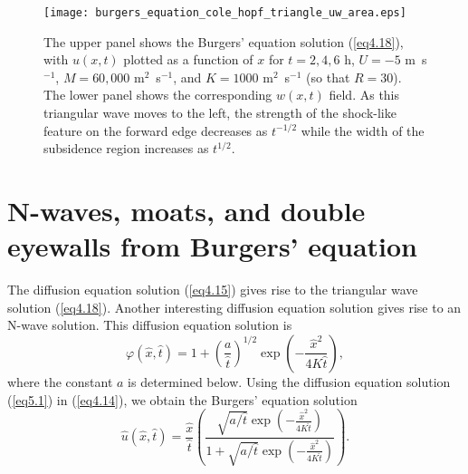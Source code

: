\documentclass[10pt]{article}
\begin{document}
\begin{figure}[!t]             %
\centerline{\texttt{[image: burgers\_equation\_cole\_hopf\_triangle\_uw\_area.eps]}}
\caption{The upper panel shows the Burgers' equation solution (\ref{eq4.18}),
with $u(x,t)$ plotted as a function of $x$ for $t=2,4,6$ h, $U=-5$ m\, s$^{-1}$,
$M=60,000$ m$^2$~s$^{-1}$, and $K=1000$ m$^2$~s$^{-1}$ (so that $R=30$). The lower
panel shows the corresponding $w(x,t)$ field. As this triangular wave
moves to the left, the strength of the shock-like feature on the forward edge decreases as $t^{-1/2}$
while the width of the subsidence region increases as $t^{1/2}$.}
\end{figure}



\section{N-waves, moats, and double eyewalls from Burgers' equation}    %

     The diffusion equation solution (\ref{eq4.15}) gives rise to the
triangular wave solution (\ref{eq4.18}). Another interesting diffusion equation
solution gives rise to an N-wave solution. This diffusion equation
solution is
\begin{equation}                                 %
     \varphi(\hat{x},\hat{t}) = 1 + \left(\frac{a}{\hat{t}}\right)^{1/2}
                        \exp\left(-\frac{\hat{x}^2}{4K\hat{t}}\right),
\label{eq5.1}
\end{equation}
where the constant $a$ is determined below. Using the diffusion equation
solution (\ref{eq5.1}) in (\ref{eq4.14}), we obtain the Burgers' equation
solution
\begin{equation}                                 %
   \hat{u}(\hat{x},\hat{t}) = \frac{\hat{x}}{\hat{t}}
            \left(\frac{\sqrt{a/\hat{t}}\exp\left(-\frac{\hat{x}^2}{4K\hat{t}}\right)}
                     {1+\sqrt{a/\hat{t}}\exp\left(-\frac{\hat{x}^2}{4K\hat{t}}\right)}\right).
\label{eq5.2}
\end{equation}
\end{document}
